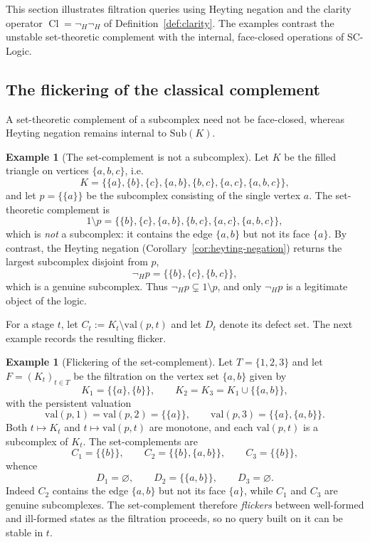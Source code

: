\documentclass[final,12pt]{elsarticle}
\theoremstyle{plain}
\theoremstyle{definition}
\newtheorem{exa}[thm]{Example}
\begin{document}
This section illustrates filtration queries using Heyting negation and the
clarity operator $\mathop{\mathrm{Cl}}=\neg_H\neg_H$ of
Definition~\ref{def:clarity}. The examples contrast the unstable set-theoretic
complement with the internal, face-closed operations of SC-Logic.


\subsection{The flickering of the classical complement}

A set-theoretic complement of a subcomplex need not be face-closed, whereas
Heyting negation remains internal to $\mathrm{Sub}(K)$.

\begin{exa}[The set-complement is not a subcomplex]
\label{ex:complement-not-subcomplex}
Let $K$ be the filled triangle on vertices $\{a,b,c\}$, i.e.
\[
K=\bigl\{\{a\},\{b\},\{c\},\{a,b\},\{b,c\},\{a,c\},\{a,b,c\}\bigr\},
\]
and let $p=\{\{a\}\}$ be the subcomplex consisting of the single vertex
$a$. The set-theoretic complement is
\[
1\setminus p=\bigl\{\{b\},\{c\},\{a,b\},\{b,c\},\{a,c\},\{a,b,c\}\bigr\},
\]
which is \emph{not} a subcomplex: it contains the edge $\{a,b\}$ but not
its face $\{a\}$. By contrast, the Heyting negation
(Corollary~\ref{cor:heyting-negation}) returns the largest subcomplex
disjoint from $p$,
\[
\neg_H p=\{\{b\},\{c\},\{b,c\}\},
\]
which is a genuine subcomplex. Thus $\neg_H p\subsetneq 1\setminus p$,
and only $\neg_H p$ is a legitimate object of the logic.
\end{exa}

For a stage $t$, let $C_t:=K_t\setminus\mathrm{val}(p,t)$ and let $D_t$
denote its defect set. The next example records the resulting flicker.

\begin{exa}[Flickering of the set-complement]
\label{ex:flickering-complement}
Let $T=\{1,2,3\}$ and let $F=(K_t)_{t\in T}$ be the filtration on the
vertex set $\{a,b\}$ given by
\[
K_1=\bigl\{\{a\},\{b\}\bigr\},
\qquad
K_2=K_3=K_1\cup\bigl\{\{a,b\}\bigr\},
\]
with the persistent valuation
\[
\mathrm{val}(p,1)=\mathrm{val}(p,2)=\bigl\{\{a\}\bigr\},
\qquad
\mathrm{val}(p,3)=\bigl\{\{a\},\{a,b\}\bigr\}.
\]
Both $t\mapsto K_t$ and $t\mapsto\mathrm{val}(p,t)$ are monotone, and
each $\mathrm{val}(p,t)$ is a subcomplex of $K_t$. The set-complements
are
\[
C_1=\bigl\{\{b\}\bigr\},
\qquad
C_2=\bigl\{\{b\},\{a,b\}\bigr\},
\qquad
C_3=\bigl\{\{b\}\bigr\},
\]
whence
\[
D_1=\varnothing,
\qquad
D_2=\bigl\{\{a,b\}\bigr\},
\qquad
D_3=\varnothing .
\]
Indeed $C_2$ contains the edge $\{a,b\}$ but not its face $\{a\}$,
while $C_1$ and $C_3$ are genuine subcomplexes. The set-complement
therefore \emph{flickers} between well-formed and ill-formed states as
the filtration proceeds, so no query built on it can be stable in $t$.
\end{exa}
\end{document}
